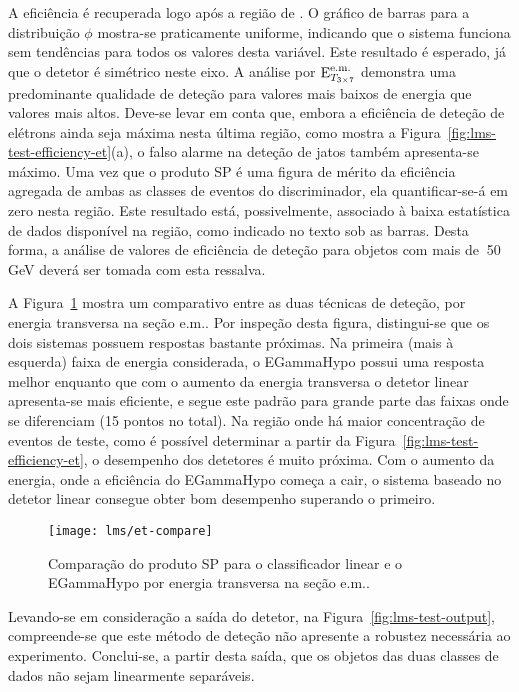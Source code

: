 A eficiência é recuperada logo após a região de . O gráfico de
barras para a distribuição $\phi$ mostra-se praticamente uniforme, indicando
que o sistema funciona sem tendências para todos os valores desta
variável. Este resultado é esperado, já que o detetor é simétrico neste
eixo. A análise por $\text{E}^{\text{e.m.}}_{T_{3\times7}}$ demonstra uma predominante qualidade de deteção
para valores mais baixos de energia que valores mais altos. Deve-se levar em
conta que, embora a eficiência de deteção de elétrons ainda seja máxima nesta
última região, como mostra a Figura~\ref{fig:lms-test-efficiency-et}(a), o falso
alarme na deteção de jatos também apresenta-se máximo. Uma vez que o produto
SP é uma figura de mérito da eficiência agregada de ambas as classes de
eventos do discriminador, ela quantificar-se-á em zero nesta região. Este
resultado está, possivelmente, associado à baixa estatística de dados
disponível na região, como indicado no texto sob as barras. Desta forma, a
análise de valores de eficiência de deteção para objetos com mais de $~$50 GeV
deverá ser tomada com esta ressalva.

A Figura~\ref{fig:lms-vs-egamma} mostra um comparativo entre as duas técnicas
de deteção, por energia transversa na seção e.m.. Por inspeção desta figura,
distingui-se que os dois sistemas possuem respostas bastante próximas. Na
primeira (mais à esquerda) faixa de energia considerada, o EGammaHypo possui
uma resposta melhor enquanto que com o aumento da energia transversa o detetor
linear apresenta-se mais eficiente, e segue este padrão para grande parte das
faixas onde se diferenciam (15 pontos no total). Na região onde há maior
concentração de eventos de teste, como é possível determinar a partir da
Figura~\ref{fig:lms-test-efficiency-et}, o desempenho dos detetores é muito
próxima. Com o aumento da energia, onde a eficiência do EGammaHypo começa a
cair, o sistema baseado no detetor linear consegue obter bom desempenho
superando o primeiro.

\begin{figure}
\begin{center}
\texttt{[image: lms/et-compare]}
\end{center}
\caption{Comparação do produto SP para o classificador linear e o
EGammaHypo por energia transversa na seção e.m..}
\label{fig:lms-vs-egamma}
\end{figure}

Levando-se em consideração a saída do detetor, na
Figura~\ref{fig:lms-test-output}, compreende-se que este método de deteção não
apresente a robustez necessária ao experimento. Conclui-se, a partir desta
saída, que os objetos das duas classes de dados não sejam linearmente
separáveis.

